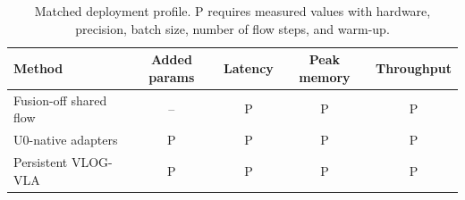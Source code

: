 \begin{table}[t]
\centering
\scriptsize
\setlength{\tabcolsep}{3pt}
\begin{tabular}{lcccc}
\toprule
Method & Added params & Latency & Peak memory & Throughput \\
\midrule
Fusion-off shared flow & -- & P & P & P \\
U0-native adapters & P & P & P & P \\
Persistent VLOG-VLA & P & P & P & P \\
\bottomrule
\end{tabular}
\caption{Matched deployment profile.  P requires measured values with hardware,
precision, batch size, number of flow steps, and warm-up.}
\label{tab:efficiency}
\end{table}
